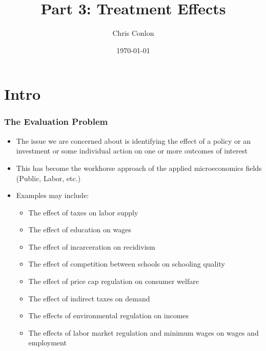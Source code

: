 \documentclass[xcolor=pdftex,dvipsnames,table,mathserif]{beamer}
\begin{document}
\title{Part 3: Treatment Effects}
\author{Chris Conlon}
\date{\today}

\frame{\titlepage}

\section{Intro}

\begin{frame}
\frametitle{The Evaluation Problem}
\begin{itemize}
\item The issue we are concerned about is identifying the effect of a policy or an investment or some individual action on one or more outcomes of interest
\item This has become the workhorse approach of the applied microeconomics fields (Public, Labor, etc.)
\item Examples may include:
\begin{itemize}
\item The effect of taxes on labor supply
\item The effect of education on wages
\item The effect of incarceration on recidivism
\item The effect of competition between schools on schooling quality
\item The effect of price cap regulation on consumer welfare
\item The effect of indirect taxes on demand
\item The effects of environmental regulation on incomes
\item The effects of labor market regulation and minimum wages on wages and employment
\end{itemize}
\end{itemize}
\end{frame}
\end{document}
